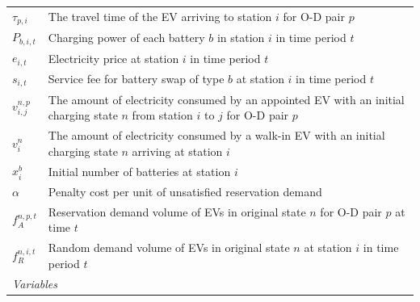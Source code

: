 \documentclass[12pt,hyperref,a4paper,UTF8]{ctexart}
\begin{document}
\begin{table}[!htbp]
\begin{tabular}{@{}lp{12cm}@{}}
    $\tau_{p,i}$ & The travel time of the EV arriving to station $i$ for O-D pair $p$\\
    $P_{b,i,t}$ & Charging power of each battery $b$ in station $i$ in time period $t$\\
    $e_{i,t}$ & Electricity price at station $i$ in time period $t$\\
    $s_{i,t}$ & Service fee for battery swap of type $b$ at station $i$ in time period $t$\\
    $v^{n,p}_{i,j}$ & The amount of electricity consumed by an appointed EV with an initial charging state $n$ from station $i$ to $j$ for O-D pair $p$\\
    $v^{n}_{i}$ & The amount of electricity consumed by a walk-in EV with an initial charging state $n$ arriving at station $i$\\
    $x_i^b$ & Initial number of batteries at station $i$ \\
    $\alpha$ & Penalty cost per unit of unsatisfied reservation demand\\
    $f_A^{n,p,t}$ & Reservation demand volume of EVs in original state $n$ for O-D pair $p$ at time $t$ \\
    $f_{R}^{n,i,t}$ & Random demand volume of EVs in original state $n$ at station $i$ in time period $t$ \\
    \midrule
    \multicolumn{2}{l}{\textit{Variables}} \\

\end{tabular}
\end{table}
\end{document}
